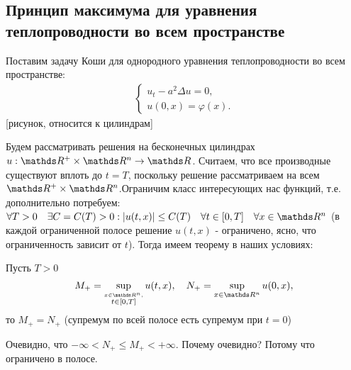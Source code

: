 
\subsection{Принцип максимума для уравнения теплопроводности во всем пространстве}
Поставим задачу Коши для однородного уравнения теплопроводности во всем пространстве:
\begin{align}
    \begin{cases} 
        u_t - a^2 \Delta u = 0, \\
        u (0, x) = \varphi (x).
    \end{cases}
\label{heathomcauchy}
\end{align}
[рисунок, относится к цилиндрам]

Будем рассматривать решения на бесконечных цилиндрах $u : \real^+ \times \real^n \rightarrow \real$. Считаем, что все производные существуют вплоть до $t = T$, поскольку решение рассматриваем на всем $\real^+ \times \real^n $.Ограничим класс интересующих нас функций, т.е. дополнительно потребуем: $ \forall T > 0 \quad \exists C = C(T) > 0 : |u(t, x)| \leq C(T) \quad \forall t \in [0, T] \quad \forall x \in \real^n$ (в каждой ограниченной полосе решение $u(t, x)$ - ограничено, ясно, что ограниченность зависит от $t$). Тогда имеем теорему в наших условиях:

\begin{theorem}

Пусть $T > 0$ $$ M_+ = \sup_{\stackrel{x \in \real^n,} {t \in [0, T]}}u(t,x), \quad N_+ = \sup_{x \in \real^n} u(0, x), $$ то $M_+ = N_+$ (супремум по всей полосе есть супремум при $t = 0$)

\begin{note}
Очевидно, что $-\infty < N_+ \leq M_+ < +\infty.$ Почему очевидно? Потому что ограничено в полосе.
\end{note}
\end{theorem}

